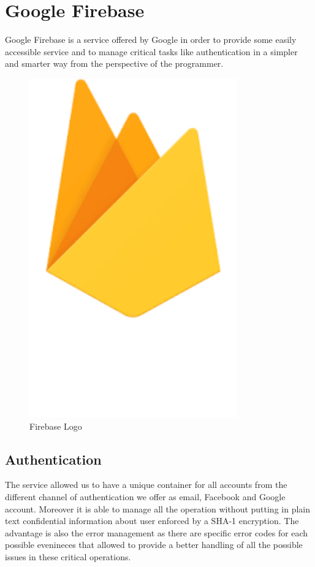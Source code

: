\section{Google Firebase}
Google Firebase is a service offered by Google in order to provide some easily accessible service and to manage critical tasks like authentication in a simpler and smarter way from the perspective of the programmer.
\begin{figure}[H]
		\begin{center}
			\centering
			\includegraphics[width=0.8\textwidth]{img/firebaseLogo.png}
			\caption{Firebase Logo}
		\end{center}
	\end{figure}
\subsection{Authentication}
The service allowed us to have a unique container for all accounts from the different channel of authentication we offer as email, Facebook and Google account. 
Moreover it is able to manage all the operation without putting in plain text confidential information about user enforced by a SHA-1 encryption. 
The advantage is also the error management as there are specific error codes for each possible evenineces that allowed to provide a better handling of all the possible issues in these critical operations.

